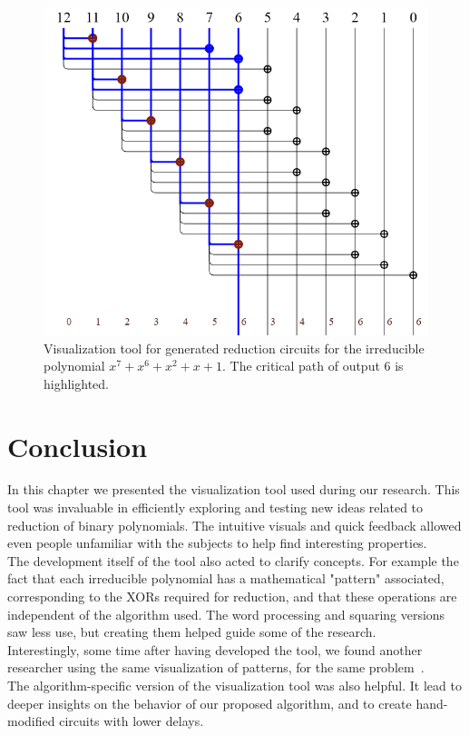 \begin{figure}
  \caption{Visualization tool for generated reduction circuits for the irreducible polynomial $x^7 + x^6 + x^2 + x + 1$. The critical path of output 6 is highlighted.}
  \label{fig:circuit_reducing_critical_7_6_1_0}
  \centering
  \includegraphics[width = .8\columnwidth]{figures/reducing-critical-7-6-2-1-0.png}
\end{figure}

\section{Conclusion} \label{section:visual:conclusion}

In this chapter we presented the visualization tool used during our research. This tool was invaluable in efficiently exploring and testing new ideas related to reduction of binary polynomials. The intuitive visuals and quick feedback allowed even people unfamiliar with the subjects to help find interesting properties. \\

The development itself of the tool also acted to clarify concepts. For example the fact that each irreducible polynomial has a mathematical "pattern" associated, corresponding to the XORs required for reduction, and that these operations are independent of the algorithm used. The word processing and squaring versions saw less use, but creating them helped guide some of the research. \\

Interestingly, some time after having developed the tool, we found another researcher using the same visualization of patterns, for the same problem~\cite{paper_com_imagens_dos_padroes}. \\

The algorithm-specific version of the visualization tool was also helpful. It lead to deeper insights on the behavior of our proposed algorithm, and to create hand-modified circuits with lower delays.